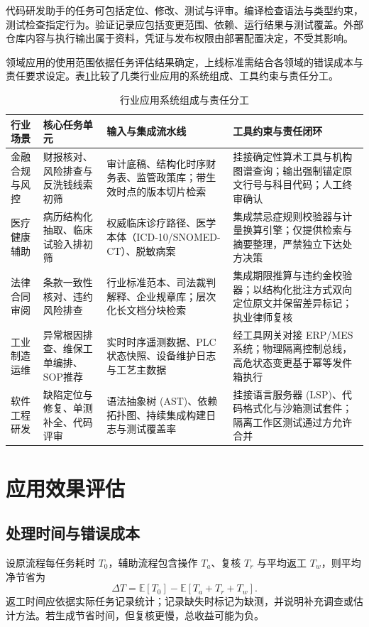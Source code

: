 \documentclass[../textbook.tex]{subfiles}
\begin{document}
代码研发助手的任务可包括定位、修改、测试与评审。编译检查语法与类型约束，测试检查指定行为。验证记录应包括变更范围、依赖、运行结果与测试覆盖。外部仓库内容与执行输出属于资料，凭证与发布权限由部署配置决定，不受其影响。

领域应用的使用范围依据任务评估结果确定，上线标准需结合各领域的错误成本与责任要求设定。表\ref{tab:domain-patterns}比较了几类行业应用的系统组成、工具约束与责任分工。

\begin{table}[htbp]
\centering
\caption{行业应用系统组成与责任分工}
\label{tab:domain-patterns}
\begin{tabularx}{\linewidth}{@{}p{1.8cm}p{2.3cm}p{3.2cm}X@{}}
\toprule
行业场景 & 核心任务单元 & 输入与集成流水线 & 工具约束与责任闭环\\
\midrule
金融合规与风控 & 财报核对、风险排查与反洗钱线索初筛 & 审计底稿、结构化时序财务表、监管政策库；带生效时点的版本切片检索 & 挂接确定性算术工具与机构图谱查询；输出强制锚定原文行号与科目代码；人工终审确认\\
医疗健康辅助 & 病历结构化抽取、临床试验入排初筛 & 权威临床诊疗路径、医学本体（ICD-10/SNOMED-CT）、脱敏病案 & 集成禁忌症规则校验器与计量换算引擎；仅提供检索与摘要整理，严禁独立下达处方决策\\
法律合同审阅 & 条款一致性核对、违约风险排查 & 行业标准范本、司法裁判解释、企业规章库；层次化长文档分块检索 & 集成期限推算与违约金校验器；以结构化批注方式双向定位原文并保留差异标记；执业律师复核\\
工业制造运维 & 异常根因排查、维保工单编排、SOP推荐 & 实时时序遥测数据、PLC 状态快照、设备维护日志与工艺主数据 & 经工具网关对接 ERP/MES 系统；物理隔离控制总线，高危状态变更基于幂等发件箱执行\\
软件工程研发 & 缺陷定位与修复、单测补全、代码评审 & 语法抽象树 (AST)、依赖拓扑图、持续集成构建日志与测试覆盖率 & 挂接语言服务器 (LSP)、代码格式化与沙箱测试套件；隔离工作区测试通过方允许合并\\
\bottomrule
\end{tabularx}
\end{table}

\section{应用效果评估}

\subsection{处理时间与错误成本}
设原流程每任务耗时 $T_0$，辅助流程包含操作 $T_a$、复核 $T_r$ 与平均返工 $T_w$，则平均净节省为
\begin{equation}
 \Delta T=\mathbb E[T_0]-\mathbb E[T_a+T_r+T_w].
 \label{eq:domain-timesave}
\end{equation}
返工时间应依据实际任务记录统计；记录缺失时标记为缺测，并说明补充调查或估计方法。若生成节省时间，但复核更慢，总收益可能为负。
\end{document}
